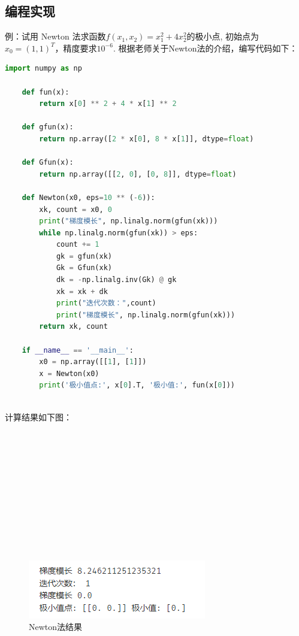 \documentclass[12pt,a4paper]{article}
\begin{document}
\subsection{编程实现}
例：试用 Newton 法求函数$f(x_1,x_2)=x_1^2+4x_2^2$的极小点,
初始点为$x_0=(1,1)^T$，精度要求$10^{-6}$.
根据老师关于Newton法的介绍，编写代码如下：
\begin{lstlisting}[language={python}]
    import numpy as np

    def fun(x):     
        return x[0] ** 2 + 4 * x[1] ** 2

    def gfun(x):
        return np.array([2 * x[0], 8 * x[1]], dtype=float)

    def Gfun(x):
        return np.array([[2, 0], [0, 8]], dtype=float)

    def Newton(x0, eps=10 ** (-6)):
        xk, count = x0, 0
        print("梯度模长", np.linalg.norm(gfun(xk)))
        while np.linalg.norm(gfun(xk)) > eps:
            count += 1
            gk = gfun(xk)
            Gk = Gfun(xk)
            dk = -np.linalg.inv(Gk) @ gk
            xk = xk + dk
            print("迭代次数：",count)
            print("梯度模长", np.linalg.norm(gfun(xk)))
        return xk, count

    if __name__ == '__main__':
        x0 = np.array([[1], [1]])
        x = Newton(x0)
        print('极小值点:', x[0].T, '极小值:', fun(x[0]))
\end{lstlisting}
~\\
计算结果如下图：
~\\~\\~\\~\\~\\~\\~\\~\\~\\~\\~\\~\\
\begin{figure}
    \centering
    \includegraphics[scale=1.0]{Newton.png}
    \caption{Newton法结果}
    \label{fig:2}
\end{figure}
~\\~\\~\\~\\
\end{document}
